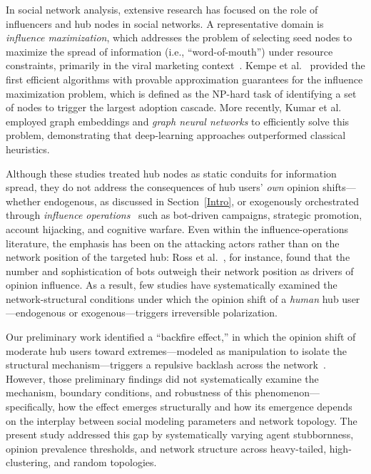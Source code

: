 \documentclass[pdflatex,sn-mathphys-num]{sn-jnl}%
\theoremstyle{thmstyleone}%
\theoremstyle{thmstyletwo}%
\theoremstyle{thmstylethree}%
\def\Dgreen{\color[rgb]{0.02,0.55,0.04}}
\def\Black{\color[rgb]{0,0,0}}
\begin{document}
In social network analysis, extensive research has
focused on the role of influencers and hub nodes in social networks. A
representative domain is \emph{influence maximization}, which
addresses the problem of selecting seed nodes to maximize the spread
of information (i.e., ``word-of-mouth'') under resource constraints,
primarily in the viral marketing context~\cite{Kempe2003,Kitsak2010,Budak2011,Kumar2022}. 
Kempe et al.~\cite{Kempe2003} provided the first efficient algorithms with
provable approximation guarantees for the influence maximization
problem, which is defined as the NP-hard task of identifying a set of nodes to
trigger the largest adoption cascade. More recently, Kumar et
al.~\cite{Kumar2022} employed graph embeddings and {\em graph neural networks} to efficiently solve this problem, demonstrating that deep-learning approaches outperformed classical heuristics.
\par


\Dgreen
Although these studies treated hub nodes as static conduits for information spread,
they do not address the consequences of hub users' \emph{own} opinion shifts---whether
endogenous, as discussed in Section~\ref{Intro}, or exogenously orchestrated through
\emph{influence operations}~\cite{Beskow2019,Ross2019,Bergh2020,Goldstein2023} such
as bot-driven campaigns, strategic promotion, account hijacking, and cognitive warfare.
Even within the influence-operations literature, the emphasis has been on the
attacking actors rather than on the network position of the targeted hub:
Ross et al.~\cite{Ross2019}, for instance, found that the number and sophistication
of bots outweigh their network position as drivers of opinion influence.
As a result, few studies have systematically examined the network-structural
conditions under which the opinion shift of a \emph{human} hub user---endogenous or
exogenous---triggers irreversible polarization.

Our preliminary work identified a ``backfire effect,'' in which the opinion
shift of moderate hub users toward extremes---modeled as manipulation to
isolate the structural mechanism---triggers a repulsive backlash across
the network~\cite{Takeda2026}. However, those preliminary findings did not systematically
examine the mechanism, boundary conditions, and robustness of this phenomenon---
specifically, how the effect emerges structurally and
how its emergence depends on the
interplay between social modeling parameters and network topology.
The present study addressed this gap by systematically varying agent stubbornness,
opinion prevalence thresholds, and network structure across heavy-tailed,
high-clustering, and random topologies.
\Black
\par
\end{document}
